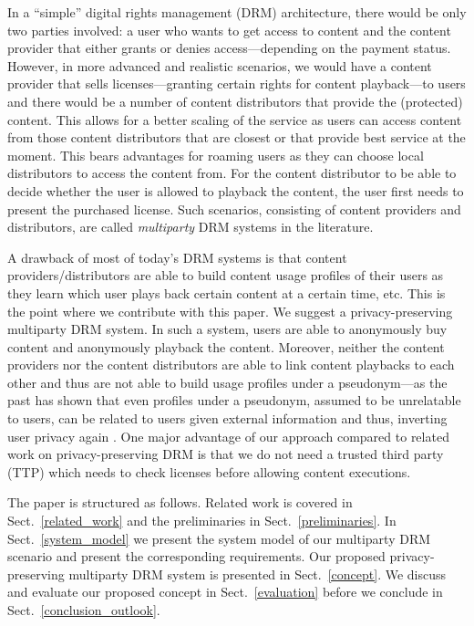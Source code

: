 \documentclass{llncs}
\newcommand{\refSec}[1]{Sect.~\ref{#1}}
\begin{document}
In a ``simple'' digital rights management (DRM) architecture, there would be only two parties involved: a user who wants to get access to content and the content provider that either grants or denies access---depending on the payment status. However, in more advanced and realistic scenarios, we would have a content provider that sells licenses---granting certain rights for content playback---to users and there would be a number of content distributors that provide the (protected) content. This allows for a better scaling of the service as users can access content from those content distributors that are closest or that provide best service at the moment. This bears advantages for roaming users as they can choose local distributors to access the content from. For the content distributor to be able to decide whether the user is allowed to playback the content, the user first needs to present the purchased license. Such scenarios, consisting of content providers and distributors, are called \emph{multiparty} DRM systems in the literature. 

A drawback of most of today's DRM systems is that content providers/distributors are able to build content usage profiles of their users as they learn which user plays back certain content at a certain time, etc. This is the point where we contribute with this paper. We suggest a privacy-preserving multiparty DRM system. In such a system, users are able to anonymously buy content and anonymously playback the content. Moreover, neither the content providers nor the content distributors are able to link content playbacks to each other and thus are not able to build usage profiles under a pseudonym---as the past has shown that even profiles under a pseudonym, assumed to be unrelatable to users, can be related to users given external information and thus, inverting user privacy again \cite{netflix}. One major advantage of our approach compared to related work on privacy-preserving DRM is that we do not need a trusted third party (TTP) which needs to check licenses before allowing content executions. 

The paper is structured as follows. Related work is covered in \refSec{related_work} and the preliminaries in \refSec{preliminaries}. In \refSec{system_model} we present the system model of our multiparty DRM scenario and present the corresponding requirements. Our proposed privacy-preserving multiparty DRM system is presented in \refSec{concept}. We discuss and evaluate our proposed concept in \refSec{evaluation} before we conclude in \refSec{conclusion_outlook}. 
\end{document}
